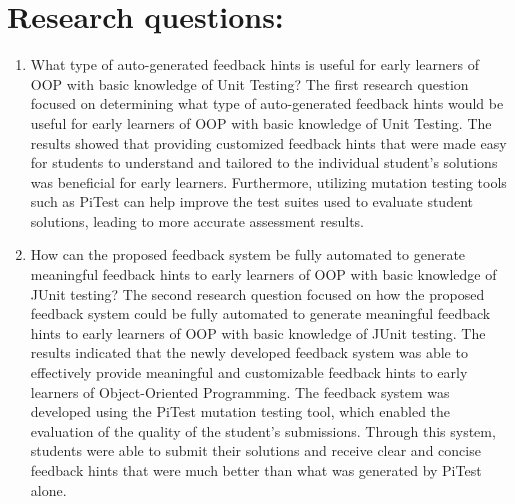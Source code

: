 \section{Research questions:}
\begin{enumerate}
\item  What type of auto-generated feedback hints is useful for early learners of OOP with basic knowledge of Unit Testing? 
The first research question focused on determining what type of auto-generated feedback hints would be useful for early learners of OOP with basic knowledge of Unit Testing. The results showed that providing customized feedback hints that were made easy for students to understand and tailored to the individual student’s solutions was beneficial for early learners. Furthermore, utilizing mutation testing tools such as PiTest can help improve the test suites used to evaluate student solutions, leading to more accurate assessment results.
\item  How can the proposed feedback system be fully automated to generate meaningful feedback hints to early learners of OOP with basic knowledge of JUnit testing?
The second research question focused on how the proposed feedback system could be fully automated to generate meaningful feedback hints to early learners of OOP with basic knowledge of JUnit testing. The results indicated that the newly developed feedback system was able to effectively provide meaningful and customizable feedback hints to early learners of Object-Oriented Programming. The feedback system was developed using the PiTest mutation testing tool, which enabled the evaluation of the quality of the student’s submissions. Through this system, students were able to submit their solutions and receive clear and concise feedback hints that were much better than what was generated by PiTest alone.
\end{enumerate}
\\
\\
\\
\\
